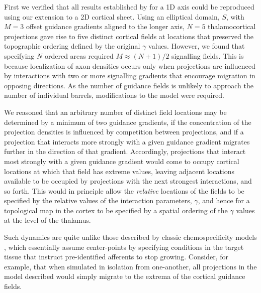 \documentclass[9pt,lineno]{elife}
\newcommand{\cmnt}[1]{\textcolor{colcmnt}{#1}}
\begin{document}
First we verified that all results established by \cite{karbowski_model_2004}
for a 1D axis could be reproduced using our extension to a 2D cortical
sheet. Using an elliptical domain, $S$, with $M=3$ offset guidance gradients
aligned to the longer axis, $N=5$ thalamocortical projections gave rise to
five distinct cortical fields at locations that preserved the topographic
ordering defined by the original $\gamma$ values. However, we found that
specifying $N$ ordered areas required $M\approx (N+1)/2$ signalling
fields. This is because localization of axon densities occurs only when
projections are influenced by interactions with two or more signalling
gradients that encourage migration in opposing directions. As the number of
guidance fields is unlikely to approach the number of individual barrels,
\cmnt{modifications to the model} were required.

\cmnt{We reasoned that an arbitrary number of distinct field locations may
  be determined by a minimum of two guidance gradients, if the concentration
  of the projection densities is influenced by competition between
  projections, and if a projection that interacts more strongly with a given
  guidance gradient migrates further in the direction of that gradient.
  Accordingly, projections that interact most strongly with a given
  guidance gradient would come to occupy cortical locations at which that
  field has extreme values, leaving adjacent locations available to be
  occupied by projections with the next strongest interactions, and so
  forth. This would in principle allow the \emph{relative} locations of the
  fields to be specified by the relative values of the interaction parameters,
  $\gamma$, and hence for a topological map in the cortex to be specified by a
  spatial ordering of the $\gamma$ values at the level of the thalamus.}

\cmnt{Such dynamics are quite unlike those described by classic
  chemospecificity models} \citep{sperry_chemoaffinity_1963}, \cmnt{which
  essentially assume center-points by specifying conditions in the target
  tissue that instruct pre-identified afferents to stop growing. Consider, for
  example, that when simulated in isolation from one-another, all projections
  in the model described would simply migrate to the extrema of the cortical
  guidance fields.}
\end{document}
